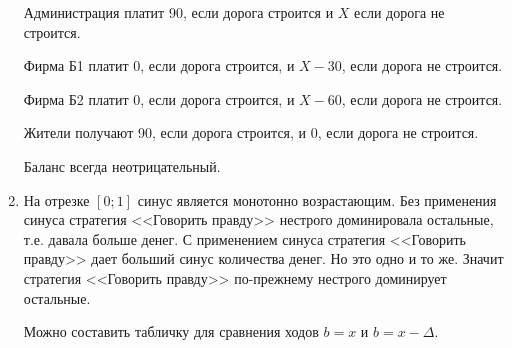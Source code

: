 \begin{enumerate}
Администрация платит 90, если дорога строится и $ X $ если дорога не строится.  

Фирма Б1 платит 0, если дорога строится, и $ X-30 $, если дорога не строится.

Фирма Б2 платит 0, если дорога строится, и $ X-60 $, если дорога не строится.

Жители получают 90, если дорога строится, и 0, если дорога не строится.

Баланс всегда неотрицательный.


\item На отрезке $ [0;1] $ синус является монотонно возрастающим. Без применения синуса стратегия <<Говорить правду>> нестрого доминировала остальные, т.е. давала больше денег. С применением синуса стратегия <<Говорить правду>> дает больший синус количества денег. Но это одно и то же. Значит стратегия <<Говорить правду>> по-прежнему нестрого доминирует остальные. 

Можно составить табличку для сравнения ходов $ b=x $ и $ b=x-\Delta $.


\end{enumerate}


